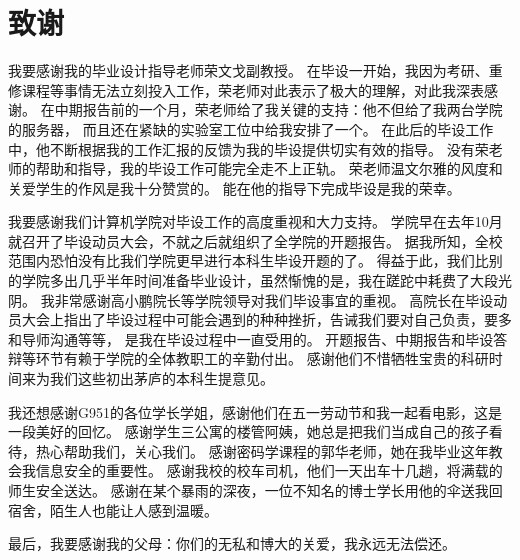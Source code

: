 \chapter*{致谢}

我要感谢我的毕业设计指导老师荣文戈副教授。
在毕设一开始，我因为考研、重修课程等事情无法立刻投入工作，荣老师对此表示了极大的理解，对此我深表感谢。
在中期报告前的一个月，荣老师给了我关键的支持：他不但给了我两台学院的服务器，
而且还在紧缺的实验室工位中给我安排了一个。
在此后的毕设工作中，他不断根据我的工作汇报的反馈为我的毕设提供切实有效的指导。
没有荣老师的帮助和指导，我的毕设工作可能完全走不上正轨。
荣老师温文尔雅的风度和关爱学生的作风是我十分赞赏的。
能在他的指导下完成毕设是我的荣幸。

我要感谢我们计算机学院对毕设工作的高度重视和大力支持。
学院早在去年10月就召开了毕设动员大会，不就之后就组织了全学院的开题报告。
据我所知，全校范围内恐怕没有比我们学院更早进行本科生毕设开题的了。
得益于此，我们比别的学院多出几乎半年时间准备毕业设计，虽然惭愧的是，我在蹉跎中耗费了大段光阴。
我非常感谢高小鹏院长等学院领导对我们毕设事宜的重视。
高院长在毕设动员大会上指出了毕设过程中可能会遇到的种种挫折，告诫我们要对自己负责，要多和导师沟通等等，
是我在毕设过程中一直受用的。
开题报告、中期报告和毕设答辩等环节有赖于学院的全体教职工的辛勤付出。
感谢他们不惜牺牲宝贵的科研时间来为我们这些初出茅庐的本科生提意见。

我还想感谢G951的各位学长学姐，感谢他们在五一劳动节和我一起看电影，这是一段美好的回忆。
感谢学生三公寓的楼管阿姨，她总是把我们当成自己的孩子看待，热心帮助我们，关心我们。
感谢密码学课程的郭华老师，她在我毕业这年教会我信息安全的重要性。
感谢我校的校车司机，他们一天出车十几趟，将满载的师生安全送达。
感谢在某个暴雨的深夜，一位不知名的博士学长用他的伞送我回宿舍，陌生人也能让人感到温暖。

最后，我要感谢我的父母：你们的无私和博大的关爱，我永远无法偿还。
